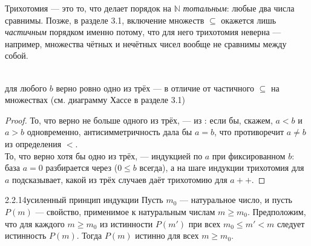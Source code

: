 \begin{intuition}
Трихотомия — это то, что делает порядок на $\mathbb{N}$ \emph{тотальным}: любые два числа
сравнимы. Позже, в разделе 3.1, включение множеств $\subseteq$ окажется лишь
\emph{частичным} порядком именно потому, что для него трихотомия неверна — например,
множества чётных и нечётных чисел вообще не сравнимы между собой.

\begin{center}
\\
{\footnotesize\color{intuitiongray}для любого $b$ верно ровно одно из трёх — в отличие от
частичного $\subseteq$ на множествах (см. диаграмму Хассе в разделе 3.1)}
\end{center}
\end{intuition}

\begin{proof}
То, что верно не больше одного из трёх, — из :
если бы, скажем, $a<b$ и $a>b$ одновременно, антисимметричность дала бы $a=b$, что
противоречит $a \neq b$ из определения $<$.\\
То, что верно хотя бы одно из трёх, — индукцией по $a$ при фиксированном $b$: база $a=0$
разбирается через  ($0 \leq b$ всегда), а на
шаге индукции трихотомия для $a$ подсказывает, какой из трёх случаев даёт трихотомию для
$a{+}{+}$.
\end{proof}

\begin{proposition}{2.2.14}{усиленный принцип индукции}
Пусть $m_0$ — натуральное число, и пусть $P(m)$ — свойство, применимое к натуральным
числам $m \geq m_0$. Предположим, что для каждого $m \geq m_0$ из истинности $P(m')$ при
всех $m_0 \leq m' < m$ следует истинность $P(m)$. Тогда $P(m)$ истинно для всех
$m \geq m_0$.
\end{proposition}

